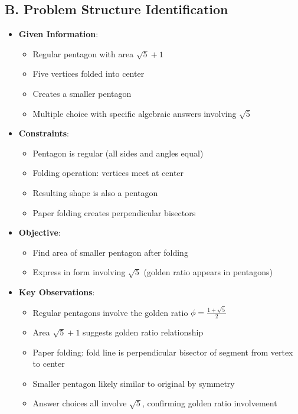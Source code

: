 \documentclass[12pt]{article}
\begin{document}
\begin{problemconfigbox}
\subsection*{B. Problem Structure Identification}
\begin{itemize}[leftmargin=*]
    \item \textbf{Given Information}: 
    \begin{itemize}
        \item Regular pentagon with area $\sqrt{5}+1$
        \item Five vertices folded into center
        \item Creates a smaller pentagon
        \item Multiple choice with specific algebraic answers involving $\sqrt{5}$
    \end{itemize}
    \item \textbf{Constraints}: 
    \begin{itemize}
        \item Pentagon is regular (all sides and angles equal)
        \item Folding operation: vertices meet at center
        \item Resulting shape is also a pentagon
        \item Paper folding creates perpendicular bisectors
    \end{itemize}
    \item \textbf{Objective}: 
    \begin{itemize}
        \item Find area of smaller pentagon after folding
        \item Express in form involving $\sqrt{5}$ (golden ratio appears in pentagons)
    \end{itemize}
    \item \textbf{Key Observations}: 
    \begin{itemize}
        \item Regular pentagons involve the golden ratio $\phi = \frac{1+\sqrt{5}}{2}$
        \item Area $\sqrt{5}+1$ suggests golden ratio relationship
        \item Paper folding: fold line is perpendicular bisector of segment from vertex to center
        \item Smaller pentagon likely similar to original by symmetry
        \item Answer choices all involve $\sqrt{5}$, confirming golden ratio involvement
    \end{itemize}
\end{itemize}


\end{problemconfigbox}
\end{document}
